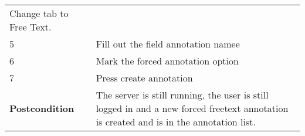 \begin{longtable}[c]{@{}ll@{}}
\begin{minipage}[t]{0.63\columnwidth}\raggedright\strut
Change tab to Free Text.
\strut\end{minipage}\tabularnewline
\begin{minipage}[t]{0.31\columnwidth}\raggedright\strut
5
\strut\end{minipage} &
\begin{minipage}[t]{0.63\columnwidth}\raggedright\strut
Fill out the field annotation namee
\strut\end{minipage}\tabularnewline
\begin{minipage}[t]{0.31\columnwidth}\raggedright\strut
6
\strut\end{minipage} &
\begin{minipage}[t]{0.63\columnwidth}\raggedright\strut
Mark the forced annotation option
\strut\end{minipage}\tabularnewline
\begin{minipage}[t]{0.31\columnwidth}\raggedright\strut
7
\strut\end{minipage} &
\begin{minipage}[t]{0.63\columnwidth}\raggedright\strut
Press create annotation
\strut\end{minipage}\tabularnewline
\begin{minipage}[t]{0.31\columnwidth}\raggedright\strut
\textbf{Postcondition}
\strut\end{minipage} &
\begin{minipage}[t]{0.63\columnwidth}\raggedright\strut
The server is still running, the user is still logged in and a new
forced freetext annotation is created and is in the annotation list.
\strut\end{minipage}\tabularnewline
\bottomrule
\end{longtable}

